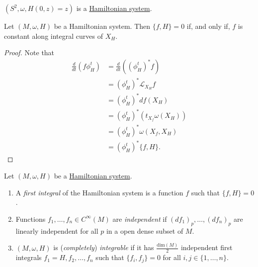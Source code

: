 \documentclass[misc]{subfiles}
\begin{document}
\begin{Exp}
    $(S^2,\omega,H(0,z)=z)$ is a \hyperref[Dfn: Hamiltonian system]{Hamiltonian system}.
\end{Exp}

\begin{Prp}
    Let $(M,\omega,H)$ be a Hamiltonian system. Then $\{f,H\}=0$ if, and only if, $f$ is constant along integral curves of $X_H$.

    \begin{proof}
    
        Note that
        \begin{align*}
            \frac{d}{dt}(f\phi_H^t) &= \frac{d}{dt}((\phi_H^t)^\ast f) \\
                                    &= (\phi_H^t)^\ast\mathcal{L}_{X_H}f \\
                                    &= (\phi_H^t)^\ast df(X_H) \\
                                    &= (\phi_H^t)^\ast (t_{X_f}\omega(X_H)) \\
                                    &= (\phi_H^t)^\ast \omega(X_f, X_H) \\
                                    &= (\phi_H^t)^\ast \{f,H\}.
        \end{align*}
    \end{proof}
\end{Prp}

\begin{Dfn}\label{Dfn: First integrals}
    Let $(M,\omega,H)$ be a \hyperref[Dfn: Hamiltonian system]{Hamiltonian system}.

    \begin{enumerate}[label=\DfnLbl]
    
        \item A \emph{first integral} of the Hamiltonian system is a function $f$ such that $\{f,H\}=0$.

        \item Functions $f_1,\dots,f_n\in C^\infty(M)$ are \emph{independent} if $(df_1)_p,\dots,(df_n)_p$ are linearly independent for all $p$ in a open dense subset of $M$.

        \item $(M,\omega,H)$ is (\emph{completely}) \emph{integrable} if it has $\frac{\text{dim}(M)}{2}$ independent first integrals $f_1=H,f_2,\dots,f_n$ such that $\{f_i,f_j\}=0$ for all $i,j\in\{1,\dots,n\}$.
    \end{enumerate}
\end{Dfn}
\end{document}
